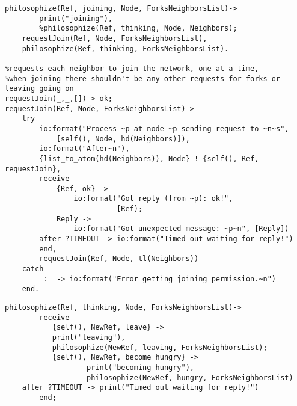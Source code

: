 \documentclass[11pt]{article}
\begin{document}
\begin{lstlisting}
philosophize(Ref, joining, Node, ForksNeighborsList)->
        print("joining"),
        %philosophize(Ref, thinking, Node, Neighbors);
    requestJoin(Ref, Node, ForksNeighborsList),
    philosophize(Ref, thinking, ForksNeighborsList).
    
%requests each neighbor to join the network, one at a time,
%when joining there shouldn't be any other requests for forks or leaving going on
requestJoin(_,_,[])-> ok;
requestJoin(Ref, Node, ForksNeighborsList)->
    try
        io:format("Process ~p at node ~p sending request to ~n~s",
            [self(), Node, hd(Neighbors)]),
        io:format("After~n"),
        {list_to_atom(hd(Neighbors)), Node} ! {self(), Ref, requestJoin},
        receive
            {Ref, ok} ->
                io:format("Got reply (from ~p): ok!",
                          [Ref);
            Reply ->
                io:format("Got unexpected message: ~p~n", [Reply])
        after ?TIMEOUT -> io:format("Timed out waiting for reply!")
        end,
        requestJoin(Ref, Node, tl(Neighbors))
    catch
        _:_ -> io:format("Error getting joining permission.~n")
    end.
\end{lstlisting}

\begin{lstlisting}
philosophize(Ref, thinking, Node, ForksNeighborsList)->
        receive
           {self(), NewRef, leave} ->
           print("leaving"),
           philosophize(NewRef, leaving, ForksNeighborsList);
           {self(), NewRef, become_hungry} ->
                   print("becoming hungry"),
                   philosophize(NewRef, hungry, ForksNeighborsList)
	after ?TIMEOUT -> print("Timed out waiting for reply!")
        end;
\end{lstlisting}
\end{document}
